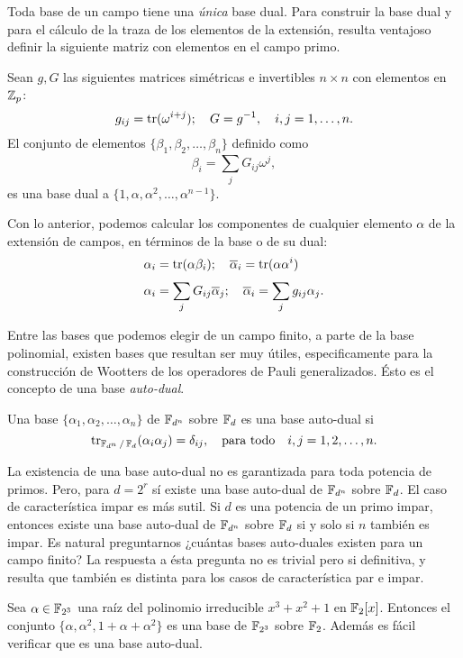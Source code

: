 Toda base de un campo tiene una \textit{única} base dual.
Para construir la base dual y para el cálculo de la traza de
los elementos de la extensión, resulta ventajoso definir la
siguiente matriz con elementos en el campo primo.
\begin{proposition}
  Sean $g,G$ las siguientes matrices simétricas e
  invertibles $n \times n$ con elementos en $\operatorname{\mathbb{Z}}_p$:
  \begin{equation}
    g_{ij}
    = \operatorname{tr}(\omega^{i+j});
    \quad
    G = g^{-1},
    \quad
    i,j = 1,\ldots,n.
  \end{equation}
  El conjunto de elementos
  $\{\beta_1,\beta_2,\ldots,\beta_n\}$ definido como
  \begin{equation}
    \beta_i = \sum_{j}^{} G_{ij} \omega^{j},
  \end{equation}
  es una base dual a
  $\{1,\alpha,\alpha^2,\ldots,\alpha^{n-1}\}$.
\end{proposition}
Con lo anterior, podemos calcular los componentes de
cualquier elemento $\alpha$ de la extensión de campos, en
términos de la base o de su dual:
\begin{align}
  \alpha_i
  &= \operatorname{tr}(\alpha \beta_i);
  \quad
  \overline{\alpha}_i
  = \operatorname{tr}(\alpha \alpha^{i}) \\
  \alpha_i 
  &= \sum_{j}^{} G_{ij} \overline{\alpha}_j;
  \quad
  \overline{\alpha}_i
  = \sum_{j}^{} g_{ij} \alpha_j.
\end{align} 

Entre las bases que podemos elegir de un campo finito,
a parte de la base polinomial, existen bases que resultan
ser muy útiles, especificamente para la construcción de
Wootters de los operadores de Pauli generalizados. Ésto es
el concepto de una base \textit{auto-dual}.
\begin{definition}
  Una base $\{\alpha_1,\alpha_2,\ldots,\alpha_n\}$ de
  $\operatorname{\mathbb{F}}_{d^{n}}$ sobre $\operatorname{\mathbb{F}}_d$ es una base auto-dual si
  \begin{equation}
    \operatorname{tr}_{\operatorname{\mathbb{F}}_{d^{n}} / \operatorname{\mathbb{F}}_d}(\alpha_i \alpha_j)
    = \delta_{ij},
    \quad
    \text{para todo}
    \quad
    i,j = 1,2,\ldots,n.
  \end{equation}
\end{definition}
La existencia de una base auto-dual no es garantizada para
toda potencia de primos. Pero, para $d = 2^{r}$ sí existe
una base auto-dual de $\operatorname{\mathbb{F}}_{d^{n}}$ sobre $\operatorname{\mathbb{F}}_d$. El caso de
característica impar es más sutil. Si $d$ es una potencia de
un primo impar, entonces existe una base auto-dual de
$\operatorname{\mathbb{F}}_{d^{n}}$ sobre $\operatorname{\mathbb{F}}_d$ si y solo si $n$ también es impar.
Es natural preguntarnos ¿cuántas bases auto-duales existen
para un campo finito? La respuesta a ésta pregunta no es
trivial pero si definitiva, y resulta que también es
distinta para los casos de característica par e impar.
\begin{example}
  Sea $\alpha \in \operatorname{\mathbb{F}}_{2^3}$ una raíz del polinomio
  irreducible $x^3+x^2+1$ en $\operatorname{\mathbb{F}}_2[x]$. Entonces el conjunto
  $\{\alpha,\alpha^2,1+\alpha+\alpha^2\}$ es una base de
  $\operatorname{\mathbb{F}}_{2^3}$ sobre $\operatorname{\mathbb{F}}_2$. Además es fácil verificar que es
  una base auto-dual.
\end{example}

